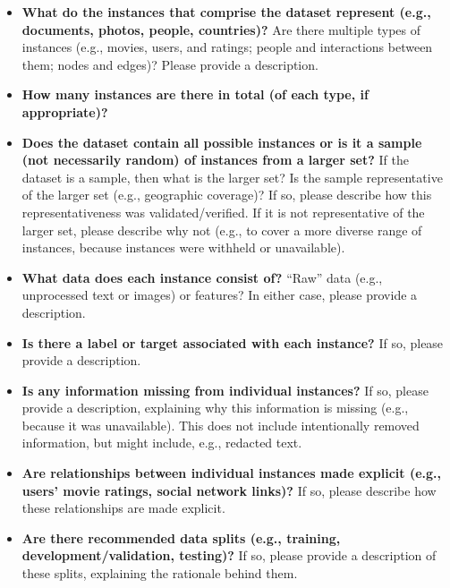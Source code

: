 \begin{itemize}

\item \textbf{What do the instances that comprise the dataset
    represent (e.g., documents, photos, people, countries)?} Are there
  multiple types of instances (e.g., movies, users, and ratings;
  people and interactions between them; nodes and edges)? Please
  provide a description.

\item \textbf{How many instances are there in total (of each type, if appropriate)?}

\item \textbf{Does the dataset contain all possible instances or is it
    a sample (not necessarily random) of instances from a larger set?}
  If the dataset is a sample, then what is the larger set? Is the
  sample representative of the larger set (e.g., geographic coverage)?
  If so, please describe how this representativeness was
  validated/verified. If it is not representative of the larger set,
  please describe why not (e.g., to cover a more diverse range of
  instances, because instances were withheld or unavailable).

\item \textbf{What data does each instance consist of?} ``Raw'' data
  (e.g., unprocessed text or images) or features? In either case,
  please provide a description.

\item \textbf{Is there a label or target associated with each
    instance?} If so, please provide a description.

\item \textbf{Is any information missing from individual instances?}
  If so, please provide a description, explaining why this information
  is missing (e.g., because it was unavailable). This does not include
  intentionally removed information, but might include, e.g., redacted
  text.

\item \textbf{Are relationships between individual instances made
    explicit (e.g., users' movie ratings, social network links)?} If
  so, please describe how these relationships are made explicit.

\item \textbf{Are there recommended data splits (e.g., training,
    development/validation, testing)?} If so, please provide a
  description of these splits, explaining the rationale behind them.


\end{itemize}
